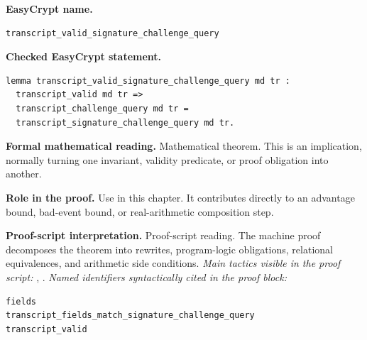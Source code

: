 \begin{formaltheorem}
\noindent\textbf{EasyCrypt name.}
\begin{lstlisting}[language=EasyCrypt,basicstyle=\ttfamily\scriptsize]
transcript_valid_signature_challenge_query
\end{lstlisting}
\noindent\textbf{Checked EasyCrypt statement.}
\begin{lstlisting}[language=EasyCrypt,basicstyle=\ttfamily\scriptsize]
lemma transcript_valid_signature_challenge_query md tr :
  transcript_valid md tr =>
  transcript_challenge_query md tr =
  transcript_signature_challenge_query md tr.
\end{lstlisting}
\noindent\textbf{Formal mathematical reading.}
Mathematical theorem. This is an implication, normally turning one invariant, validity predicate, or proof obligation into another.

\noindent\textbf{Role in the proof.}
Use in this chapter. It contributes directly to an advantage bound, bad-event bound, or real-arithmetic composition step.

\noindent\textbf{Proof-script interpretation.}
Proof-script reading. The machine proof decomposes the theorem into rewrites, program-logic obligations, relational equivalences, and arithmetic side conditions.
\emph{Main tactics visible in the proof script:} , .
\emph{Named identifiers syntactically cited in the proof block:}
\begin{lstlisting}[language=EasyCrypt,basicstyle=\ttfamily\scriptsize]
fields
transcript_fields_match_signature_challenge_query
transcript_valid
\end{lstlisting}

\end{formaltheorem}

